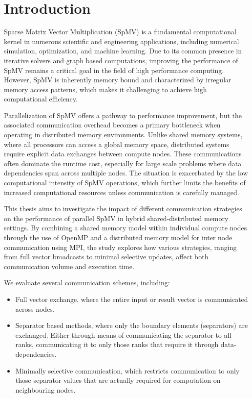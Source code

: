 \chapter{Introduction}
Sparse Matrix Vector Multiplication (SpMV) is a fundamental computational kernel in numerous scientific and engineering applications, including numerical simulation, optimization, and machine learning. Due to its common presence in iterative solvers and graph based computations, improving the performance of SpMV remains a critical goal in the field of high performance computing. However, SpMV is inherently memory bound and characterized by irregular memory access patterns, which makes it challenging to achieve high computational efficiency. 
\medskip

Parallelization of SpMV offers a pathway to performance improvement, but the associated communication overhead becomes a primary bottleneck when operating in distributed memory environments. Unlike shared memory systems, where all processors can access a global memory space, distributed systems require explicit data exchanges between compute nodes. These communications often dominate the runtime cost, especially for large scale problems where data dependencies span across multiple nodes. The situation is exacerbated by the low computational intensity of SpMV operations, which further limits the benefits of increased computational resources unless communication is carefully managed.
\medskip


This thesis aims to investigate the impact of different communication strategies on the performance of parallel SpMV in hybrid shared-distributed memory settings. By combining a shared memory model within individual compute nodes through the use of OpenMP and a distributed memory model for inter node communication using MPI, the study explores how various strategies, ranging from full vector broadcasts to minimal selective updates, affect both communication volume and execution time.
\medskip

We evaluate several communication schemes, including:

\begin{itemize}
    \item Full vector exchange, where the entire input or result vector is communicated across nodes.

    \item Separator based methods, where only the boundary elements (separators) are exchanged. Either through means of communicating the separator to all ranks, communicating it to only those ranks that require it through data-dependencies.

    \item Minimally selective communication, which restricts communication to only those separator values that are actually required for computation on neighbouring nodes.
\end{itemize}
\medskip

